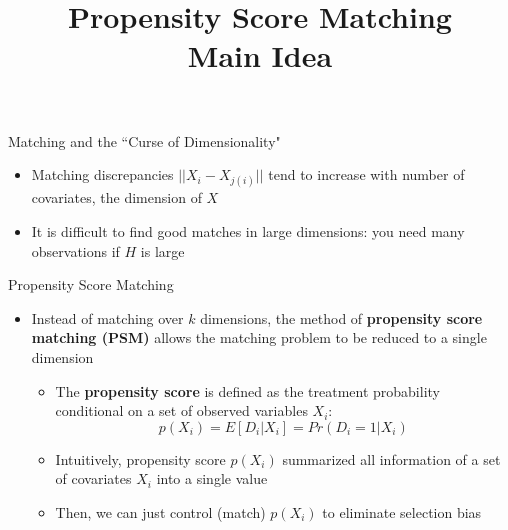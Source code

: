 \documentclass[dvipsnames,hyperref={pdfpagelabels=false}]{beamer}
\begin{document}
\begin{frame}{Matching and the ``Curse of Dimensionality"}
\begin{itemize}
\item Matching discrepancies $||X_i-X_{j(i)}||$ tend to increase with number of covariates, the dimension of $X$
\vspace{0.2cm}
\item It is difficult to find good matches in large dimensions: you need many observations if $H$ is large
\end{itemize}
\end{frame}


\title[]  
{Propensity Score Matching \\ Main Idea}

\author 
{}

\institute{}

\date
{}

\begin{frame}{}
\titlepage
\end{frame}


\begin{frame}{Propensity Score Matching}
\begin{itemize}
\item Instead of matching over $k$ dimensions, the method of \textbf{propensity score matching (PSM)} allows the matching
problem to be reduced to a single dimension
\vspace{0.2cm}
\begin{itemize}
\item The \textbf{propensity score} is defined as the treatment probability conditional on a set of observed variables $X_{i}$: 
	\begin{equation*}
	p(X_{i})=E[D_{i}|X_{i}]=Pr(D_{i}=1|X_{i})
	\end{equation*}

\item Intuitively, propensity score $p(X_{i})$ summarized all information of a set of covariates $X_{i}$ into a single value  
\vspace{0.2cm}
\item Then, we can just control (match) $p(X_{i})$ to eliminate selection bias
\end{itemize}
\end{itemize}
\end{frame}
\end{document}
